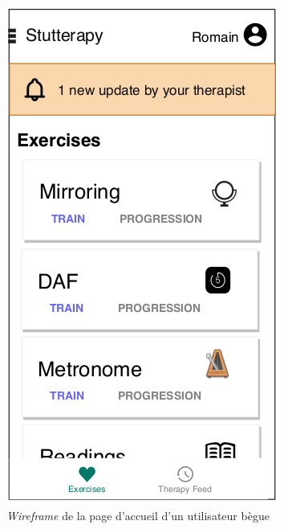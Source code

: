 \begin{figure}[H]
  \includegraphics[width=.3\linewidth]{content/imgs/wireframe_ex.png}
  \caption{\textit{Wireframe} de la page d'accueil d'un utilisateur bègue}
  \label{fig:wireframe}
\end{figure}
